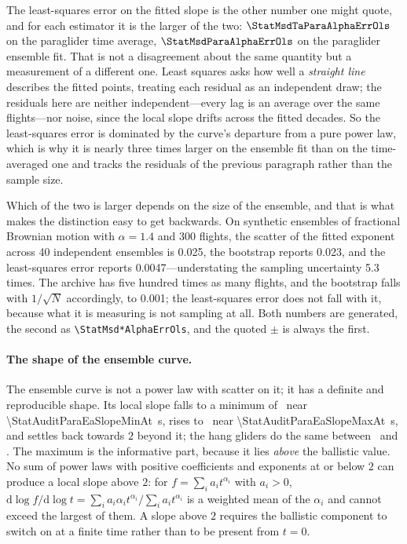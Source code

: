 \begin{revblock}
The least-squares error on the fitted slope is the other number one might quote, and for
each estimator it is the larger of the two: $\StatMsdTaParaAlphaErrOls$ on the paraglider
time average, $\StatMsdParaAlphaErrOls$ on the paraglider ensemble fit. That is not a
disagreement about the same quantity but a measurement of a different one. Least squares
asks how well a \emph{straight line} describes the fitted points, treating each residual
as an independent draw; the residuals here are neither independent---every lag is an
average over the same flights---nor noise, since the local slope drifts across the fitted
decades. So the least-squares error is dominated by the curve's departure from a pure
power law, which is why it is nearly three times larger on the ensemble fit than on the
time-averaged one and tracks the residuals of the previous paragraph rather than the
sample size.

Which of the two is larger depends on the size of the ensemble, and that is what makes the
distinction easy to get backwards. On synthetic ensembles of fractional Brownian motion
with $\alpha=1.4$ and \num{300} flights, the scatter of the fitted exponent across
\num{40} independent ensembles is \num{0.025}, the bootstrap reports \num{0.023}, and the
least-squares error reports \num{0.0047}---understating the sampling uncertainty
\num{5.3} times. The archive has five hundred times as many flights, and the bootstrap
falls with $1/\sqrt{N}$ accordingly, to \num{0.001}; the least-squares error does not
fall with it, because what it is measuring is not sampling at all. Both numbers are
generated, the second as \texttt{\textbackslash StatMsd*AlphaErrOls}, and the quoted $\pm$
is always the first.

\paragraph{The shape of the ensemble curve.}
The ensemble curve is not a power law with scatter on it; it has a definite and
reproducible shape. Its local slope falls to a minimum of \StatAuditParaEaSlopeMin\ near
\SI{\StatAuditParaEaSlopeMinAt}{\second}, rises to \StatAuditParaEaSlopeMax\ near
\SI{\StatAuditParaEaSlopeMaxAt}{\second}, and settles back towards $2$ beyond it; the hang
gliders do the same between \StatAuditHangEaSlopeMin\ and \StatAuditHangEaSlopeMax. The
maximum is the informative part, because it lies \emph{above} the ballistic value. No sum
of power laws with positive coefficients and exponents at or below $2$ can produce a local
slope above $2$: for $f=\sum_i a_i t^{\alpha_i}$ with $a_i>0$,
$\mathrm{d}\log f/\mathrm{d}\log t=\sum_i a_i\alpha_i t^{\alpha_i}/\sum_i a_i t^{\alpha_i}$
is a weighted mean of the $\alpha_i$ and cannot exceed the largest of them. A slope above
$2$ requires the ballistic component to switch on at a finite time rather than to be
present from $t=0$.


\end{revblock}
